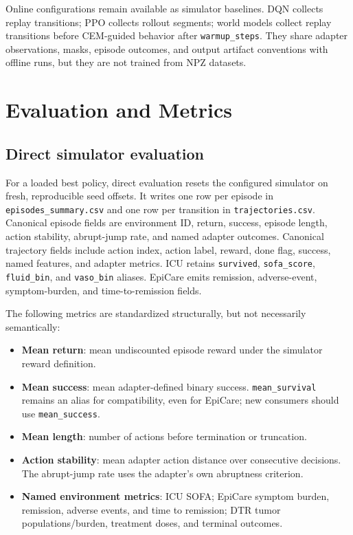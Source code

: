 \documentclass[10pt,twocolumn]{article}
\newcommand{\code}[1]{\texttt{#1}}
\begin{document}
Online configurations remain available as simulator baselines. DQN collects replay transitions; PPO collects rollout segments; world models collect replay transitions before CEM-guided behavior after \code{warmup\_steps}. They share adapter observations, masks, episode outcomes, and output artifact conventions with offline runs, but they are not trained from NPZ datasets.

\section{Evaluation and Metrics}
\label{sec:evaluation}

\subsection{Direct simulator evaluation}

For a loaded best policy, direct evaluation resets the configured simulator on fresh, reproducible seed offsets. It writes one row per episode in \code{episodes\_summary.csv} and one row per transition in \code{trajectories.csv}. Canonical episode fields are environment ID, return, success, episode length, action stability, abrupt-jump rate, and named adapter outcomes. Canonical trajectory fields include action index, action label, reward, done flag, success, named features, and adapter metrics. ICU retains \code{survived}, \code{sofa\_score}, \code{fluid\_bin}, and \code{vaso\_bin} aliases. EpiCare emits remission, adverse-event, symptom-burden, and time-to-remission fields.

The following metrics are standardized structurally, but not necessarily semantically:
\begin{itemize}
    \item \textbf{Mean return}: mean undiscounted episode reward under the simulator reward definition.
    \item \textbf{Mean success}: mean adapter-defined binary success. \code{mean\_survival} remains an alias for compatibility, even for EpiCare; new consumers should use \code{mean\_success}.
    \item \textbf{Mean length}: number of actions before termination or truncation.
    \item \textbf{Action stability}: mean adapter action distance over consecutive decisions. The abrupt-jump rate uses the adapter's own abruptness criterion.
    \item \textbf{Named environment metrics}: ICU SOFA; EpiCare symptom burden, remission, adverse events, and time to remission; DTR tumor populations/burden, treatment doses, and terminal outcomes.
\end{itemize}
\end{document}
